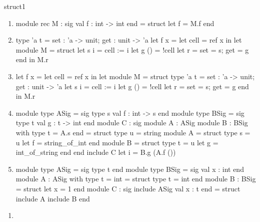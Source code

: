 \begin{exercise}{struct1}
\begin{enumerate}
\item

\begin{ocamllisting}
module rec M : sig
   val f : int -> int
end = struct
   let f = M.f
end
\end{ocamllisting}

\item

\begin{ocamllisting}
type 'a t = { set : 'a -> unit; get : unit -> 'a }
let f x =
   let cell = ref x in
   let module M = struct
      let s i = cell := i
      let g () = !cell
      let r = { set = s; get = g }
   end
   in
      M.r
\end{ocamllisting}

\item

\begin{ocamllisting}
let f x =
   let cell = ref x in
   let module M = struct
      type 'a t = { set : 'a -> unit; get : unit -> 'a }
      let s i = cell := i
      let g () = !cell
      let r = { set = s; get = g }
   end
   in
      M.r
\end{ocamllisting}

\item

\begin{ocamllisting}
module type ASig = sig type s  val f : int -> s end
module type BSig = sig type t  val g : t -> int end
module C : sig
   module A : ASig
   module B : BSig with type t = A.s
end = struct
   type u = string
   module A = struct type s = u  let f = string_of_int end
   module B = struct type t = u  let g = int_of_string end
end
include C
let i = B.g (A.f ())
\end{ocamllisting}   

\item

\begin{ocamllisting}
module type ASig = sig type t end
module type BSig = sig val x : int end
module A : ASig with type t = int
   = struct type t = int end
module B : BSig = struct let x = 1 end
module C : sig
   include ASig
   val x : t
end = struct
   include A
   include B
end
\end{ocamllisting}
\end{enumerate}

\begin{answer}\ifanswers
\begin{enumerate}
\item


\end{enumerate}
\end{answer}
\end{exercise}
